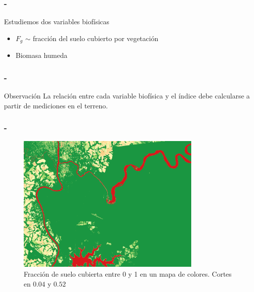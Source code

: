 \documentclass[handout]{beamer}
\begin{document}
\begin{frame}
    \frametitle{\secname-\subsecname}
    Estudiemos dos variables biof\'isicas
    \begin{itemize}[<+->]
        \item $F_g$ $\sim$ fracci\'on del suelo cubierto por vegetaci\'on
        \item Biomasa humeda
    \end{itemize}
\end{frame}

\begin{frame}
    \frametitle{\secname-\subsecname}
    \begin{block}{Observaci\'on}
        La relaci\'on entre cada variable biof\'isica y el \'indice debe
        calcularse a partir de mediciones en el terreno.
    \end{block}
\end{frame}

\begin{frame}
    \frametitle{\secname-\subsecname}
    \begin{figure}
    \begin{center}
        \includegraphics[width=0.8\textwidth]{imagenes/fg.png}
    \end{center}
    \caption{Fracci\'on de suelo cubierta entre 0 y 1 en un mapa de colores.
        Cortes en $0.04$ y $0.52$}
    \label{fig:}
    \end{figure}

\end{frame}
\end{document}
